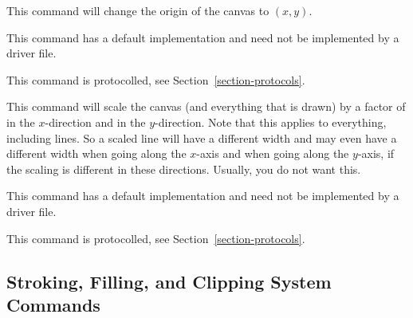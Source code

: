 \begin{command}{\pgfsys@transformshift{}}
  This command will change the origin of the canvas to $(x,y)$.

  This command has a default implementation and need not be
  implemented by a driver file.

  This command is protocolled, see Section~\ref{section-protocols}.
\end{command}

\begin{command}{\pgfsys@transformxyscale{}}
  This command will scale the canvas (and  everything that is drawn)
  by a factor of  in the $x$-direction and  in the  $y$-direction. Note that this applies to
  everything, including  lines. So a scaled line will have a different
  width and may even have a different width when going along the
  $x$-axis and when going along the $y$-axis, if the scaling is
  different in these directions. Usually, you do not want this.

  This command has a default implementation and need not be
  implemented by a driver file.

  This command is protocolled, see Section~\ref{section-protocols}.
\end{command}


\subsection{Stroking, Filling, and Clipping System Commands}

